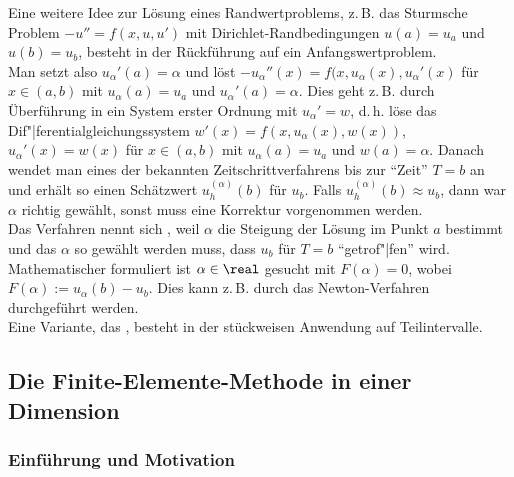 \begin{Bem}
    Eine weitere Idee zur Lösung eines Randwertproblems, z.\,B.
    das Sturmsche Problem $-u'' = f(x, u, u')$ mit Dirichlet-Randbedingungen
    $u(a) = u_a$ und $u(b) = u_b$, besteht in der Rückführung auf ein
    Anfangswertproblem.\\
    Man setzt also $u_\alpha'(a) = \alpha$ und löst
    $-u_\alpha''(x) = f(x, u_\alpha(x), u_\alpha'(x)$ für $x \in (a, b)$
    mit $u_\alpha(a) = u_a$ und $u_\alpha'(a) = \alpha$.
    Dies geht z.\,B. durch Überführung in ein System erster Ordnung mit
    $u_\alpha' = w$, d.\,h. löse das Dif"|ferentialgleichungssystem
    $w'(x) = f(x, u_\alpha(x), w(x))$, $u_\alpha'(x) = w(x)$ für $x \in (a, b)$
    mit $u_\alpha(a) = u_a$ und $w(a) = \alpha$.
    Danach wendet man eines der bekannten Zeitschrittverfahrens bis zur
    "`Zeit"' $T = b$ an und erhält so einen Schätzwert
    $u_h^{(\alpha)}(b)$ für $u_b$.
    Falls $u_h^{(\alpha)}(b) \approx u_b$, dann war $\alpha$ richtig gewählt,
    sonst muss eine Korrektur vorgenommen werden.\\
    Das Verfahren nennt sich , weil $\alpha$ die
    Steigung der Lösung im Punkt $a$ bestimmt und das $\alpha$ so gewählt
    werden muss, dass $u_b$ für $T = b$ "`getrof"|fen"' wird.\\
    Mathematischer formuliert ist $\alpha \in \real$ gesucht mit
    $F(\alpha) = 0$, wobei $F(\alpha) := u_{\alpha}(b) - u_b$.
    Dies kann z.\,B. durch das Newton-Verfahren durchgeführt werden.\\
    Eine Variante, das , besteht in der
    stückweisen Anwendung auf Teilintervalle.
\end{Bem}

\pagebreak

\subsection{%
    Die Finite-Elemente-Methode in einer Dimension%
}

\subsubsection{%
    Einführung und Motivation%
}

